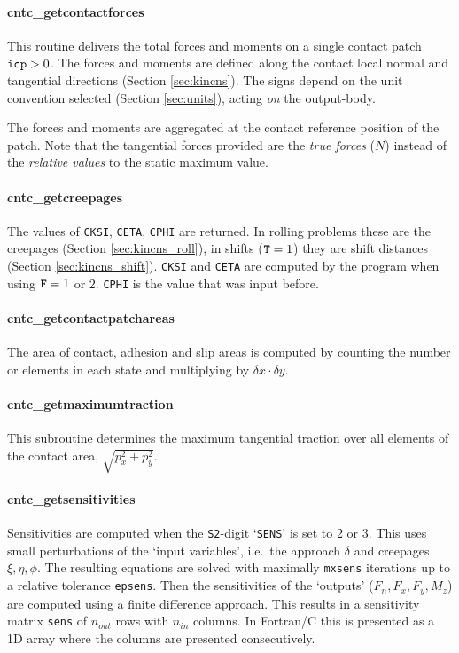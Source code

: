 \documentclass[12pt]{report}
\begin{document}
\paragraph{cntc\_getcontactforces}

This routine delivers the total forces and moments on a single contact
patch ${\tt icp}>0$. The forces and moments are defined along the contact
local normal and tangential directions (Section \ref{sec:kincns}).
The signs depend on the unit convention selected (Section \ref{sec:units}),
acting {\em on\/} the output-body.

The forces and moments are aggregated at the contact reference position of
the patch.  Note that the tangential forces provided are the {\em true
forces\/} ($N$) instead of the {\em relative values\/} to the static
maximum value.

\paragraph{cntc\_getcreepages}

The values of {\tt CKSI}, {\tt CETA}, {\tt CPHI} are returned. In rolling
problems these are the creepages (Section \ref{sec:kincns_roll}), in shifts
(${\tt T}=1$) they are shift distances (Section \ref{sec:kincns_shift}).
{\tt CKSI} and {\tt CETA} are computed by the program when using ${\tt
F}=1$ or $2$. {\tt CPHI} is the value that was input before.

\paragraph{cntc\_getcontactpatchareas}

The area of contact, adhesion and slip areas is computed by counting the
number or elements in each state and multiplying by $\delta x\cdot \delta
y$.

\paragraph{cntc\_getmaximumtraction}

This subroutine determines the maximum tangential traction
over all elements of the contact area, $\sqrt{p_x^2+p_y^2}$.

\paragraph{cntc\_getsensitivities}

Sensitivities are computed when the {\tt S2}-digit `{\tt SENS}' is set to
2 or 3. This uses small perturbations of the `input variables', i.e.\ the
approach $\delta$ and creepages $\xi, \eta, \phi$. The resulting equations are
solved with maximally {\tt mxsens} iterations up to a relative tolerance
{\tt epsens}. Then the sensitivities of the `outputs' ($F_n, F_x, F_y,
M_z$) are computed using a finite difference approach. This results in a
sensitivity matrix {\tt sens} of $n_{out}$ rows with $n_{in}$ columns. In
Fortran/C this is presented as a 1D array where the columns are presented
consecutively.
\end{document}
